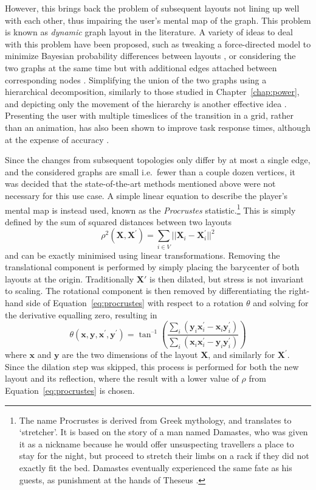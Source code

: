 However, this brings back the problem of subsequent layouts not lining up well with each other, thus impairing the user's mental map \cite{Eades1991, Diehl2001} of the graph. This problem is known as \emph{dynamic} graph layout in the literature.
A variety of ideas to deal with this problem have been proposed, such as tweaking a force-directed model to minimize Bayesian probability differences between layouts \cite{Brandes1997}, or considering the two graphs at the same time but with additional edges attached between corresponding nodes \cite{Erten2003}. Simplifying the union of the two graphs using a hierarchical decomposition, similarly to those studied in Chapter~\ref{chap:power}, and depicting only the movement of the hierarchy is another effective idea \cite{Archambault2009}. Presenting the user with multiple timeslices of the transition in a grid, rather than an animation, has also been shown to improve task response times, although at the expense of accuracy \cite{Archambault2011}.

Since the changes from subsequent topologies only differ by at most a single edge, and the considered graphs are small i.e.\ fewer than a couple dozen vertices, it was decided that the state-of-the-art methods mentioned above were not necessary for this use case. A simple linear equation to describe the player's mental map is instead used, known as the \emph{Procrustes} statistic.\footnote{The name Procrustes is derived from Greek mythology, and translates to `stretcher'. It is based on the story of a man named Damastes, who was given it as a nickname because he would offer unsuspecting travellers a place to stay for the night, but proceed to stretch their limbs on a rack if they did not exactly fit the bed. Damastes eventually experienced the same fate as his guests, as punishment at the hands of Theseus \cite{Cox2000}.}
This is simply defined by the sum of squared distances between two layouts
\begin{equation}
  \rho^2(\mathbf{X}, \mathbf{X}^\prime) = \sum_{i\in V} ||\mathbf{X}_i - \mathbf{X}_i^\prime||^2
  \label{eq:procrustes}
\end{equation}
and can be exactly minimised using linear transformations. Removing the translational component is performed by simply placing the barycenter of both layouts at the origin. Traditionally $\mathbf{X}'$ is then dilated, but stress is not invariant to scaling. The rotational component is then removed by differentiating the right-hand side of Equation~\eqref{eq:procrustes} with respect to a rotation $\theta$ and solving for the derivative equalling zero, resulting in
\begin{equation}
  \theta(\mathbf{x},\mathbf{y}, \mathbf{x^\prime}, \mathbf{y^\prime}) = 
  \tan^{\text{--}1}\left(\frac{\sum_i(\mathbf{y}_i\mathbf{x}^\prime_i-\mathbf{x}_i\mathbf{y}^\prime_i)}{\sum_i(\mathbf{x}_i\mathbf{x}^\prime_i-\mathbf{y}_i\mathbf{y}^\prime_i)}\right)
\end{equation}
where $\mathbf{x}$ and $\mathbf{y}$ are the two dimensions of the layout $\mathbf{X}$, and similarly for $\mathbf{X}^\prime$. Since the dilation step was skipped, this process is performed for both the new layout and its reflection, where the result with a lower value of $\rho$ from Equation~\eqref{eq:procrustes} is chosen.

